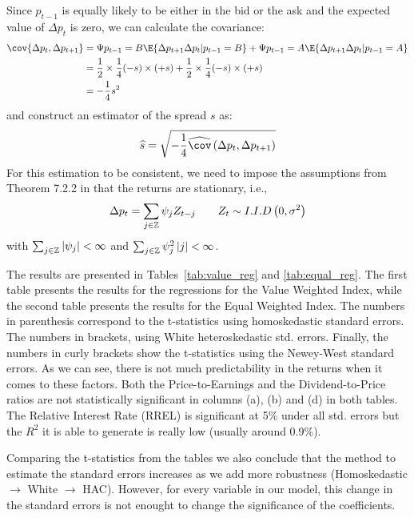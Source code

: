 \documentclass[12pt,twoside]{article}
\begin{document}
\begin{solution}
    Since \(p_{t-1}\) is equally likely to be either in the bid or the ask and the expected value of \(\Delta p_t\) is zero, we can calculate the covariance:
    \begin{align*}
        \cov{\Delta p_{t}, \Delta p_{t+1}} & = \P{p_{t-1}=B}\E{\Delta p_{t+1}\Delta p_{t} \vert p_{t-1}=B} + \P{p_{t-1}=A}\E{\Delta p_{t+1}\Delta p_{t} \vert p_{t-1}=A} \\
        & = \frac{1}{2}\times\frac{1}{4}(-s)\times(+s) + \frac{1}{2}\times\frac{1}{4}(-s)\times(+s) \\ 
        & = -\frac{1}{4}s^2
    \end{align*}
    and construct an estimator of the spread \(s\) as:
    \[
        \widehat{s} = \sqrt{-\frac{1}{4}\widehat\cov\left(\Delta p_{t},\Delta p_{t+1}\right)}
    \]
    For this estimation to be consistent, we need to impose the assumptions from Theorem 7.2.2 in \citet{brockwell2009time} that the returns are stationary, i.e., 
    \[
        \Delta p_{t} = \sum_{j \in \mathbb{Z}} \psi_j Z_{t-j} \qquad Z_t \sim I.I.D \left(0, \sigma^2\right)
    \]
    with \(\sum_{j \in \mathbb{Z}} |\psi_j| < \infty\) and \(\sum_{j \in \mathbb{Z}} \psi_j^2\left\lvert j \right\rvert < \infty\).
\end{solution}

\problem


\begin{solution}
    The results are presented in Tables~\ref{tab:value_reg} and \ref{tab:equal_reg}. The first table presents the results for the regressions for the Value Weighted Index, while the second table presents the results for the Equal Weighted Index. The numbers in parenthesis correspond to the t-statistics using homoskedastic standard errors. The numbers in brackets, using White heteroskedastic std. errors. Finally, the numbers in curly brackets show the t-statistics using the Newey-West standard errors. As we can see, there is not much predictability in the returns when it comes to these factors. Both the Price-to-Earnings and the Dividend-to-Price ratios are not statistically significant in columns (a), (b) and (d) in both tables. The Relative Interest Rate (RREL) is significant at 5\% under all std. errors but the \(R^2\) it is able to generate is really low (usually around 0.9\%). \par
    Comparing the t-statistics from the tables we also conclude that the method to estimate the standard errors increases as we add more robustness (Homoskedastic \(\rightarrow\) White \(\rightarrow\) HAC). However, for every variable in our model, this change in the standard errors is not enought to change the significance of the coefficients. \par
    
    
\end{solution}

\clearpage


\end{document}
